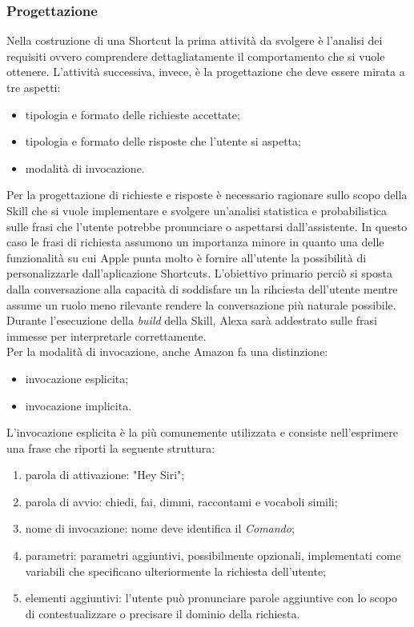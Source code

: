 		\subsubsection{Progettazione}
		Nella costruzione di una Shortcut la prima attività da svolgere è l'analisi dei requisiti ovvero comprendere dettagliatamente il comportamento che si vuole ottenere. L'attività successiva, invece, è la progettazione che deve essere mirata a tre aspetti:
		\begin{itemize}
			\item tipologia e formato delle richieste accettate;
			\item tipologia e formato delle risposte che l'utente si aspetta;
			\item modalità di invocazione.
		\end{itemize}
		Per la progettazione di richieste e risposte è necessario ragionare sullo scopo della Skill che si vuole implementare e svolgere un'analisi statistica e probabilistica sulle frasi che l'utente potrebbe pronunciare o aspettarsi dall'assistente. In questo caso le frasi di richiesta assumono un importanza minore in quanto una delle funzionalità su cui Apple punta molto è fornire all'utente la possibilità di personalizzarle dall'aplicazione Shortcuts. L'obiettivo  primario perciò si sposta dalla conversazione alla capacità di soddisfare un la rihciesta dell'utente mentre assume un ruolo meno rilevante rendere la conversazione più naturale possibile. Durante l'esecuzione della \textit{build} della Skill, Alexa sarà addestrato sulle frasi immesse per interpretarle correttamente. \\
		Per la modalità di invocazione, anche Amazon fa una distinzione:
		\begin{itemize}
			\item invocazione esplicita;
			\item invocazione implicita.
		\end{itemize}
		L'invocazione esplicita è la più comunemente utilizzata e consiste nell'esprimere una frase che riporti la seguente struttura:
		\begin{enumerate}
			\item parola di attivazione: "Hey Siri";
			\item parola di avvio: chiedi, fai, dimmi, raccontami e vocaboli simili;
			\item nome di invocazione: nome deve identifica il \textit{Comando};
			\item parametri: parametri aggiuntivi, possibilmente opzionali, implementati come variabili che specificano ulteriormente la richiesta dell'utente;
			\item elementi aggiuntivi: l'utente può pronunciare parole aggiuntive con lo scopo di contestualizzare o precisare il dominio della richiesta.
		\end{enumerate}

